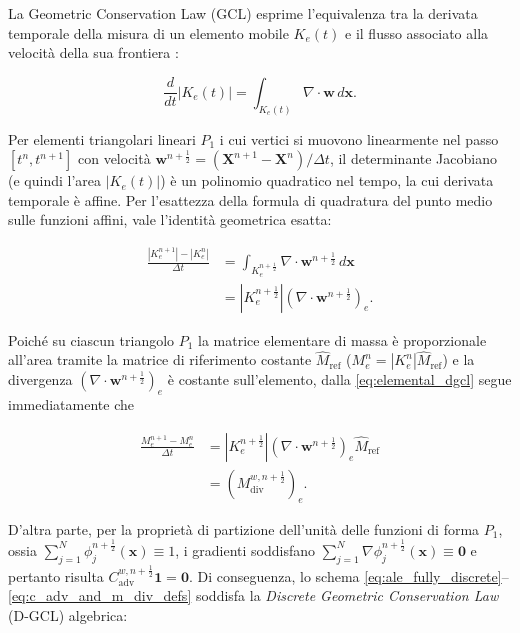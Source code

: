 La Geometric Conservation Law (GCL) esprime l'equivalenza tra la derivata temporale della misura di un elemento mobile $K_e(t)$ e il flusso associato alla velocità della sua frontiera \citep{farhat2001the,tienne2009perspective}:

\begin{equation}
\frac{d}{dt}|K_e(t)|
=
\int_{K_e(t)}
\nabla\cdot\mathbf{w}
\,d\mathbf{x}.
\label{eq:continuous_gcl}
\end{equation}

Per elementi triangolari lineari $P_1$ i cui vertici si muovono linearmente nel passo $[t^n,t^{n+1}]$ con velocità $\mathbf{w}^{n+\frac12} = \allowbreak (\mathbf{X}^{n+1}-\mathbf{X}^n)/\Delta t$, il determinante Jacobiano (e quindi l'area $|K_e(t)|$) è un polinomio quadratico nel tempo, la cui derivata temporale è affine. Per l'esattezza della formula di quadratura del punto medio sulle funzioni affini, vale l'identità geometrica esatta:

\begin{equation}
\begin{aligned}
\frac{
|K_e^{n+1}|-|K_e^n|
}{
\Delta t
}
&=
\int_{K_e^{n+\frac12}}
\nabla\cdot\mathbf{w}^{n+\frac12}
\,d\mathbf{x}
\\
&=
|K_e^{n+\frac12}|
\left(\nabla\cdot\mathbf{w}^{n+\frac12}\right)_e.
\end{aligned}
\label{eq:elemental_dgcl}
\end{equation}

Poiché su ciascun triangolo $P_1$ la matrice elementare di massa è proporzionale all'area tramite la matrice di riferimento costante $\widehat{M}_{\mathrm{ref}}$ ($M_e^n = |K_e^n|\widehat{M}_{\mathrm{ref}}$) e la divergenza $(\nabla\cdot\mathbf{w}^{n+\frac12})_e$ è costante sull'elemento, dalla \eqref{eq:elemental_dgcl} segue immediatamente che

\begin{equation}
\begin{aligned}
\frac{M_e^{n+1}-M_e^n}{\Delta t}
&=
|K_e^{n+\frac12}|
\left(\nabla\cdot\mathbf{w}^{n+\frac12}\right)_e
\widehat{M}_{\mathrm{ref}}
\\
&=
\left(M_{\mathrm{div}}^{w,n+\frac12}\right)_e.
\end{aligned}
\label{eq:mass_diff_equals_m_div}
\end{equation}

D'altra parte, per la proprietà di partizione dell'unità delle funzioni di forma $P_1$, ossia $\sum_{j=1}^N \phi_j^{n+\frac12}(\mathbf{x}) \equiv 1$, i gradienti soddisfano $\sum_{j=1}^N \nabla\phi_j^{n+\frac12}(\mathbf{x}) \equiv \mathbf{0}$ e pertanto risulta $C_{\mathrm{adv}}^{w,n+\frac12}\mathbf{1} = \mathbf{0}$. Di conseguenza, lo schema \eqref{eq:ale_fully_discrete}--\eqref{eq:c_adv_and_m_div_defs} soddisfa la \textit{Discrete Geometric Conservation Law} (D-GCL) algebrica:

